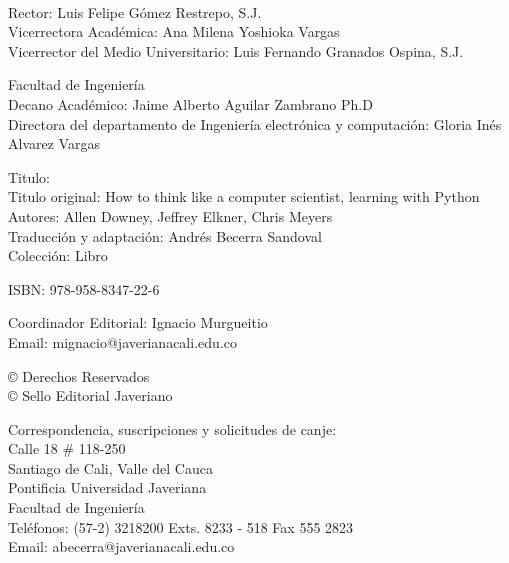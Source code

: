 \parindent0pt {\tiny{}\ }{\tiny \par}

{\scriptsize{}Rector: Luis Felipe Gómez Restrepo, S.J.}\\
{\scriptsize{} Vicerrectora Académica: Ana Milena Yoshioka Vargas}\\
{\scriptsize{} Vicerrector del Medio Universitario: Luis Fernando
Granados Ospina, S.J.}\\
{\scriptsize \par}

{\scriptsize{}Facultad de Ingeniería}\\
{\scriptsize{} Decano Académico: Jaime Alberto Aguilar Zambrano Ph.D
}\\
{\scriptsize{}Directora del departamento de Ingeniería electrónica
y computación: Gloria Inés Alvarez Vargas}\\
{\scriptsize \par}

{\scriptsize{}Titulo: \introprog }\\
{\scriptsize{} Titulo original: How to think like a computer scientist,
learning with Python Autores: Allen Downey, Jeffrey Elkner, Chris
Meyers }\\
{\scriptsize{} Traducción y adaptación: Andrés Becerra Sandoval }\\
{\scriptsize{} Colección: Libro}\\
{\scriptsize \par}

{\scriptsize{}ISBN: 978-958-8347-22-6 }\\
{\scriptsize \par}

{\scriptsize{}Coordinador Editorial: Ignacio Murgueitio}\\
{\scriptsize{} Email: mignacio@javerianacali.edu.co}{\scriptsize \par}

{\scriptsize{}© Derechos Reservados}\\
{\scriptsize{} © Sello Editorial Javeriano}\\
{\scriptsize \par}

{\scriptsize{}Correspondencia, suscripciones y solicitudes de canje:}\\
{\scriptsize{} Calle 18 \# 118-250}\\
{\scriptsize{} Santiago de Cali, Valle del Cauca}\\
{\scriptsize{} Pontificia Universidad Javeriana}\\
{\scriptsize{} Facultad de Ingeniería}\\
{\scriptsize{} Teléfonos: (57-2) 3218200 Exts. 8233 - 518 Fax 555
2823}\\
{\scriptsize{} Email: abecerra@javerianacali.edu.co }\\
{\scriptsize \par}


